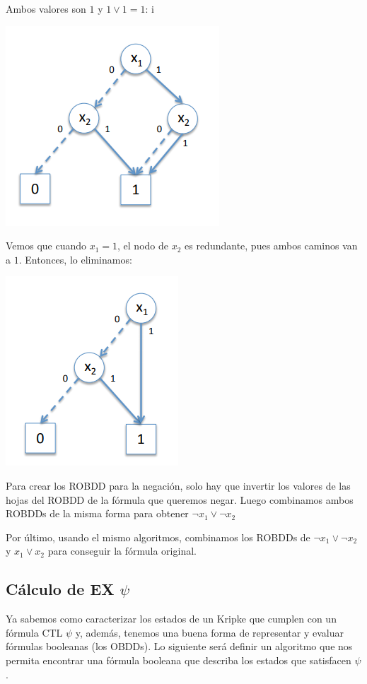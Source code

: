 Ambos valores son $1$ y $1\lor1 = 1$:
i\begin{center}
	\includegraphics[scale=0.35]{imagenes/compo-robdd11}
\end{center}

Vemos que cuando $x_1 = 1$, el nodo de $x_2$ es redundante, pues ambos caminos van a $1$. Entonces, lo eliminamos:
\begin{center}
	\includegraphics[scale=0.35]{imagenes/compo-robdd12}
\end{center}

Para crear los ROBDD para la negación, solo hay que invertir los valores de las hojas del ROBDD de la fórmula que queremos negar. Luego combinamos ambos ROBDDs de la misma forma para obtener $\lnot x_1 \lor \lnot x_2$

Por último, usando el mismo algoritmos, combinamos los ROBDDs de $\lnot x_1 \lor \lnot x_2$ y $x_1 \lor x_2$ para conseguir la fórmula original.


\subsection{Cálculo de EX $\psi$}
Ya sabemos como caracterizar los estados de un Kripke que cumplen con un fórmula CTL $\psi$ y, además, tenemos una buena forma de representar y evaluar fórmulas booleanas (los OBDDs). Lo siguiente será definir un algoritmo que nos permita encontrar una fórmula booleana que describa los estados que satisfacen $\psi$.

